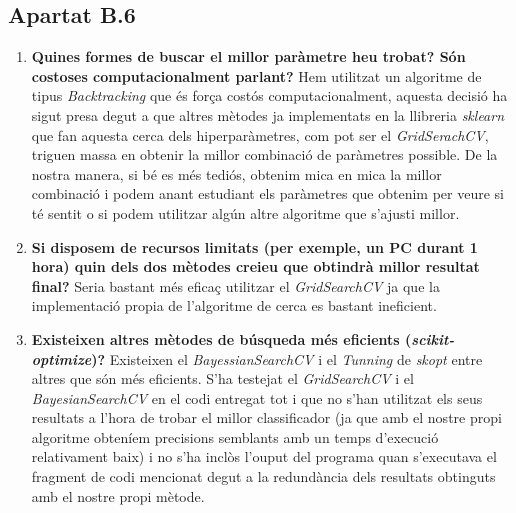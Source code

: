 \documentclass[a4paper, 11pt]{article}
\begin{document}
\subsection{Apartat B.6}
\begin{enumerate}
    \item \textbf{Quines formes de buscar el millor paràmetre heu trobat? Són costoses computacionalment parlant?} Hem utilitzat un algoritme de tipus \textit{Backtracking} que és força costós computacionalment, aquesta decisió ha sigut presa degut a que altres mètodes ja implementats en la llibreria \textit{sklearn} que fan aquesta cerca dels hiperparàmetres, com pot ser el \textit{GridSerachCV}, triguen massa en obtenir la millor combinació de paràmetres possible. De la nostra manera, si bé es més tediós, obtenim mica en mica la millor combinació i podem anant estudiant els paràmetres que obtenim per veure si té sentit o si podem utilitzar algún altre algoritme que s'ajusti millor.
    \item \textbf{Si disposem de recursos limitats (per exemple, un PC durant 1 hora) quin dels dos mètodes creieu que obtindrà millor resultat final?} Seria bastant més eficaç utilitzar el \textit{GridSearchCV} ja que la implementació propia de l'algoritme de cerca es bastant ineficient.
    \item \textbf{Existeixen altres mètodes de búsqueda més eficients (\textit{scikit-optimize})?} Existeixen el \textit{BayessianSearchCV} i el \textit{Tunning} de \textit{skopt} entre altres que són més eficients. S'ha testejat el \textit{GridSearchCV} i el \textit{BayesianSearchCV} en el codi entregat tot i que no s'han utilitzat els seus resultats a l'hora de trobar el millor classificador (ja que amb el nostre propi algoritme obteníem precisions semblants amb un temps d'execució relativament baix) i no s'ha inclòs l'ouput del programa quan s'executava el fragment de codi mencionat degut a la redundància dels resultats obtinguts amb el nostre propi mètode.
\end{enumerate}
\newpage
\end{document}
